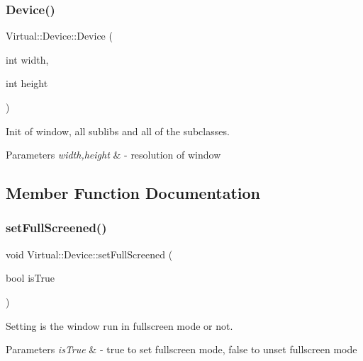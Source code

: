 \subsubsection{\texorpdfstring{Device()}{Device()}}
{\footnotesize\ttfamily Virtual\+::\+Device\+::\+Device (\begin{DoxyParamCaption}\item[{int}]{width,  }\item[{int}]{height }\end{DoxyParamCaption})}



Init of window, all sublibs and all of the subclasses. 


\begin{DoxyParams}{Parameters}
{\em width,height} & -\/ resolution of window \\
\hline
\end{DoxyParams}


\subsection{Member Function Documentation}
\hypertarget{class_virtual_1_1_device_a7f0a80fead7847616b92d0defad43d96}{}\label{class_virtual_1_1_device_a7f0a80fead7847616b92d0defad43d96} 
\subsubsection{\texorpdfstring{set\+Full\+Screened()}{setFullScreened()}}
{\footnotesize\ttfamily void Virtual\+::\+Device\+::set\+Full\+Screened (\begin{DoxyParamCaption}\item[{bool}]{is\+True }\end{DoxyParamCaption})\hspace{0.3cm}{\ttfamily [protected]}}



Setting is the window run in fullscreen mode or not. 


\begin{DoxyParams}{Parameters}
{\em is\+True} & -\/ true to set fullscreen mode, false to unset fullscreen mode \\
\hline
\end{DoxyParams}
\hypertarget{class_virtual_1_1_device_a15e199ed381e9cf1eea79ce2da30786e}{}\label{class_virtual_1_1_device_a15e199ed381e9cf1eea79ce2da30786e} 
